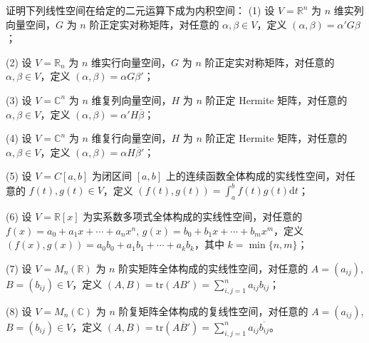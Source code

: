 \documentclass[../../main.tex]{subfiles}%
\begin{document}
\begin{example}[常见内积和内积空间]\label{example:常见内积和内积空间-例9.1}
    
证明下列线性空间在给定的二元运算下成为内积空间：
(1) 设 $V = \mathbb{R}^n$ 为 $n$ 维实列向量空间，$G$ 为 $n$ 阶正定实对称矩阵，对任意的 $\alpha, \beta \in V$，定义 $(\alpha, \beta) = \alpha'G\beta$；

(2) 设 $V = \mathbb{R}_n$ 为 $n$ 维实行向量空间，$G$ 为 $n$ 阶正定实对称矩阵，对任意的 $\alpha, \beta \in V$，定义 $(\alpha, \beta) = \alpha G\beta'$；

(3) 设 $V = \mathbb{C}^n$ 为 $n$ 维复列向量空间，$H$ 为 $n$ 阶正定 Hermite 矩阵，对任意的 $\alpha, \beta \in V$，定义 $(\alpha, \beta) = \alpha' H\overline{\beta}$；

(4) 设 $V = \mathbb{C}^n$ 为 $n$ 维复行向量空间，$H$ 为 $n$ 阶正定 Hermite 矩阵，对任意的 $\alpha, \beta \in V$，定义 $(\alpha, \beta) = \alpha H\overline{\beta}'$；

(5) 设 $V = C[a, b]$ 为闭区间 $[a, b]$ 上的连续函数全体构成的实线性空间，对任意的 $f(t), g(t) \in V$，定义 $(f(t), g(t)) = \int_{a}^{b} f(t)g(t) \mathrm{d}t$；

(6) 设 $V = \mathbb{R}[x]$ 为实系数多项式全体构成的实线性空间，对任意的 $f(x) = a_0 + a_1x + \cdots + a_nx^n$, $g(x) = b_0 + b_1x + \cdots + b_mx^m$，定义 $(f(x), g(x)) = a_0b_0 + a_1b_1 + \cdots + a_kb_k$，其中 $k = \min\{n, m\}$；

(7) 设 $V = M_n(\mathbb{R})$ 为 $n$ 阶实矩阵全体构成的实线性空间，对任意的 $A = (a_{ij})$, $B = (b_{ij}) \in V$，定义 $(A, B) = \mathrm{tr}(AB') = \sum_{i, j = 1}^{n} a_{ij}b_{ij}$；

(8) 设 $V = M_n(\mathbb{C})$ 为 $n$ 阶复矩阵全体构成的复线性空间，对任意的 $A = (a_{ij})$, $B = (b_{ij}) \in V$，定义 $(A, B) = \mathrm{tr}(A\overline{B}') = \sum_{i, j = 1}^{n} a_{ij}\overline{b_{ij}}$。
\end{example}
\end{document}
